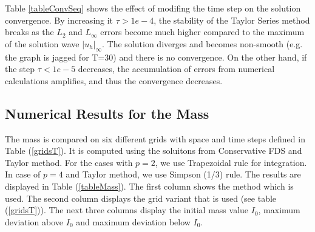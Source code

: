 \documentclass[%
 aip,
cp,  
 amsmath,amssymb,
 reprint,
]{iopconfser}
\newcommand{\rf}[1]{(\ref{#1})}
\begin{document}
Table \ref{tableConvSeq} shows the effect of modifing the time step on the solution convergence. By increasing it $\tau>1e-4$, the stability of the Taylor Series method breaks as the $L_2$ and $L_\infty$ errors become much higher compared to the maximum of the solution wave $|u_h|_\infty$. The solution diverges and becomes non-smooth (e.g. the graph is jagged for T=30) and there is no convergence. On the other hand, if the step $\tau<1e-5$ decreases, the accumulation of errors from numerical calculations amplifies, and thus the convergence decreases.

\subsection{Numerical Results for the Mass}
The mass is compared on six different grids with space and time steps defined in Table \rf{gridsT}. It is computed using the soluitons from Conservative FDS and Taylor method. For the cases with 
$p=2$, we use Trapezoidal rule for integration. In case of $p=4$ and Taylor method, we use Simpson (1/3) rule. The results are displayed in Table \rf{tableMass}. The first column shows the method which is used. The second column displays the grid variant that is used (see table \rf{gridsT}). The next three columns display the initial mass value $I_0$, maximum deviation above $I_0$ and maximum deviation below $I_0$.
\end{document}
